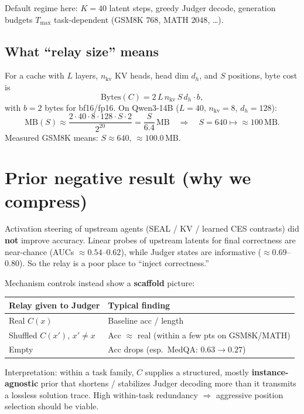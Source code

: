 \documentclass[11pt]{article}
\begin{document}
Default regime here: $K{=}40$ latent steps, greedy Judger decode, generation
budgets $T_{\max}$ task-dependent (GSM8K $768$, MATH $2048$, \ldots).

\subsection{What ``relay size'' means}

For a cache with $L$ layers, $n_{\mathrm{kv}}$ KV heads, head dim $d_h$, and
$S$ positions, byte cost is
\[
\mathrm{Bytes}(C)
  = 2\,L\,n_{\mathrm{kv}}\,S\,d_h\cdot b,
\]
with $b{=}2$ bytes for bf16/fp16. On Qwen3-14B
($L{=}40$, $n_{\mathrm{kv}}{=}8$, $d_h{=}128$):
\[
\mathrm{MB}(S)
  \approx \frac{2\cdot 40\cdot 8\cdot 128\cdot S\cdot 2}{2^{20}}
  = \frac{S}{6.4}\,\mathrm{MB}
  \quad\Rightarrow\quad
  S{=}640 \mapsto \approx 100\,\mathrm{MB}.
\]
Measured GSM8K means: $S\approx 640$, $\approx 100.0\,\mathrm{MB}$.

\section{Prior negative result (why we compress)}

Activation steering of upstream agents (SEAL / KV / learned CES contrasts) did
\textbf{not} improve accuracy. Linear probes of upstream latents for final
correctness are near-chance (AUCs $\approx 0.54$--$0.62$), while Judger states
are informative ($\approx 0.69$--$0.80$). So the relay is a poor place to
``inject correctness.''

Mechanism controls instead show a \textbf{scaffold} picture:

\begin{center}
\begin{tabular}{@{}ll@{}}
\toprule
Relay given to Judger & Typical finding \\
\midrule
Real $C(x)$ & Baseline acc / length \\
Shuffled $C(x')$, $x'\neq x$
  & Acc $\approx$ real (within a few pts on GSM8K/MATH) \\
Empty & Acc drops (esp.\ MedQA: $0.63\to 0.27$) \\
\bottomrule
\end{tabular}
\end{center}

Interpretation: within a task family, $C$ supplies a structured, mostly
\textbf{instance-agnostic} prior that shortens / stabilizes Judger decoding
more than it transmits a lossless solution trace. High within-task redundancy
$\Rightarrow$ aggressive position selection should be viable.
\end{document}

